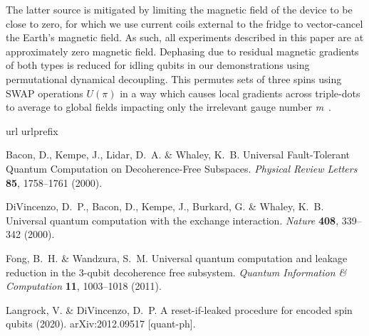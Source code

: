\documentclass[aps,prl,twocolumn,superscriptaddress,nobibnotes,10pt,floatfix]{revtex4-2}
\def\bibcommenthead{}
\begin{document}
	The latter source is mitigated by limiting the magnetic field of the device to be close to zero, for which we use current coils external to the fridge to vector-cancel the Earth's magnetic field.
	As such, all experiments described in this paper are at approximately zero magnetic field.
	Dephasing due to residual magnetic gradients of both types is reduced for idling qubits in our demonstrations using permutational dynamical decoupling.
	This permutes sets of three spins using SWAP operations $U(\pi)$ in a way which causes local gradients across triple-dots to average to global fields impacting only the irrelevant gauge number \emph{m}~\cite{sun_full-permutation_2024}.




	\begin{thebibliography}{10}
		\expandafter\ifx\csname url\endcsname\relax
		\def\url#1{\burl{#1}}\fi
		\expandafter\ifx\csname urlprefix\endcsname\relax\def\urlprefix{URL }\fi
		\providecommand{\bibinfo}[2]{#2}
		\providecommand{\eprint}[2][]{\url{#2}}
		\providecommand{\doi}[1]{\url{https://doi.org/#1}}
		\bibcommenthead

		\bibinfo{author}{Bacon, D.}, \bibinfo{author}{Kempe, J.},
		\bibinfo{author}{Lidar, D.~A.} \& \bibinfo{author}{Whaley, K.~B.}
		\newblock \bibinfo{title}{Universal {Fault}-{Tolerant} {Quantum} {Computation}
			on {Decoherence}-{Free} {Subspaces}}.
		\newblock \emph{\bibinfo{journal}{Physical Review Letters}}
		\textbf{\bibinfo{volume}{85}}, \bibinfo{pages}{1758--1761}
		(\bibinfo{year}{2000}).

		\bibinfo{author}{DiVincenzo, D.~P.}, \bibinfo{author}{Bacon, D.},
		\bibinfo{author}{Kempe, J.}, \bibinfo{author}{Burkard, G.} \&
		\bibinfo{author}{Whaley, K.~B.}
		\newblock \bibinfo{title}{Universal quantum computation with the exchange
			interaction}.
		\newblock \emph{\bibinfo{journal}{Nature}} \textbf{\bibinfo{volume}{408}},
		\bibinfo{pages}{339--342} (\bibinfo{year}{2000}).

		\bibinfo{author}{Fong, B.~H.} \& \bibinfo{author}{Wandzura, S.~M.}
		\newblock \bibinfo{title}{Universal quantum computation and leakage reduction
			in the 3-qubit decoherence free subsystem}.
		\newblock \emph{\bibinfo{journal}{Quantum Information \& Computation}}
		\textbf{\bibinfo{volume}{11}}, \bibinfo{pages}{1003--1018}
		(\bibinfo{year}{2011}).

		\bibinfo{author}{Langrock, V.} \& \bibinfo{author}{DiVincenzo, D.~P.}
		\newblock \bibinfo{title}{A reset-if-leaked procedure for encoded spin qubits}
		(\bibinfo{year}{2020}).
		\newblock \bibinfo{note}{arXiv:2012.09517 [quant-ph]}.


\end{thebibliography}
\end{document}
